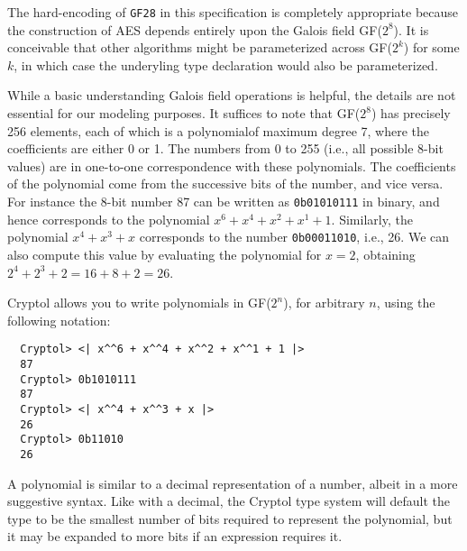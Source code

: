 The hard-encoding of \texttt{GF28} in this specification is completely
appropriate because the construction of AES depends entirely upon the
Galois field GF($2^8$).  It is conceivable that other algorithms might
be parameterized across GF($2^k$) for some $k$, in which case the
underyling type declaration would also be parameterized.

While a basic understanding Galois field operations is helpful, the
details are not essential for our modeling purposes.  It suffices to
note that GF($2^8$) has precisely 256 elements, each of which is a
polynomial\indPoly of maximum degree 7, where the coefficients are
either 0 or 1.  The numbers from 0 to 255 (i.e., all possible 8-bit
values) are in one-to-one correspondence with these polynomials.  The
coefficients of the polynomial come from the successive bits of the
number, and vice versa.  For instance the 8-bit number 87 can be
written as {\tt 0b01010111} in binary, and hence corresponds to the
polynomial $x^6 + x^4 + x^2 + x^1 + 1$. Similarly, the polynomial $x^4
+ x^3 + x$ corresponds to the number {\tt 0b00011010}, i.e., 26. We
can also compute this value by evaluating the polynomial for $x=2$,
obtaining $2^4+2^3+2 = 16+8+2 = 26$.

Cryptol allows you to write polynomials in GF($2^n$), for arbitrary
$n$, using the following notation:
\begin{Verbatim}
  Cryptol> <| x^^6 + x^^4 + x^^2 + x^^1 + 1 |>
  87
  Cryptol> 0b1010111
  87
  Cryptol> <| x^^4 + x^^3 + x |>
  26
  Cryptol> 0b11010
  26
\end{Verbatim}

A polynomial is similar to a decimal representation of a number,
albeit in a more suggestive syntax.  Like with a decimal, the Cryptol
type system will default the type to be the smallest number of bits
required to represent the polynomial, but it may be expanded to more
bits if an expression requires it.

